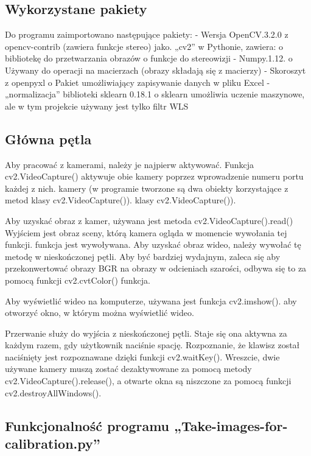 \documentclass[magisterska]{pracadypl}
\begin{document}
\subsection{Wykorzystane pakiety}

Do programu zaimportowano następujące pakiety:
- Wersja OpenCV.3.2.0 z opencv-contrib (zawiera funkcje stereo) jako.
„cv2” w Pythonie, zawiera:
o bibliotekę do przetwarzania obrazów
o funkcje do stereowizji
- Numpy.1.12.
o Używany do operacji na macierzach (obrazy składają się z macierzy)
- Skoroszyt z openpyxl
o Pakiet umożliwiający zapisywanie danych w pliku Excel
- „normalizacja” biblioteki sklearn 0.18.1
o sklearn umożliwia uczenie maszynowe, ale w tym projekcie używany jest
tylko filtr WLS

\subsection{Główna pętla}

Aby pracować z kamerami, należy je najpierw aktywować. Funkcja
cv2.VideoCapture() aktywuje obie kamery poprzez wprowadzenie numeru portu każdej z nich.
kamery (w programie tworzone są dwa obiekty korzystające z metod klasy cv2.VideoCapture()).
klasy cv2.VideoCapture()).

Aby uzyskać obraz z kamer, używana jest metoda cv2.VideoCapture().read()
Wyjściem jest obraz sceny, którą kamera ogląda w momencie wywołania tej funkcji.
funkcja jest wywoływana. Aby uzyskać obraz wideo, należy wywołać tę metodę
w nieskończonej pętli. Aby być bardziej wydajnym, zaleca się
aby przekonwertować obrazy BGR na obrazy w odcieniach szarości, odbywa się to za pomocą funkcji cv2.cvtColor()
funkcja.

Aby wyświetlić wideo na komputerze, używana jest funkcja cv2.imshow().
aby otworzyć okno, w którym można wyświetlić wideo.

Przerwanie służy do wyjścia z nieskończonej pętli. Staje się ona aktywna
za każdym razem, gdy użytkownik naciśnie spację. Rozpoznanie, że klawisz został naciśnięty
jest rozpoznawane dzięki funkcji cv2.waitKey().
Wreszcie, dwie używane kamery muszą zostać dezaktywowane za pomocą metody
cv2.VideoCapture().release(), a otwarte okna są niszczone za pomocą funkcji
cv2.destroyAllWindows().

\subsection{Funkcjonalność programu „Take-images-for-calibration.py”}
\end{document}
